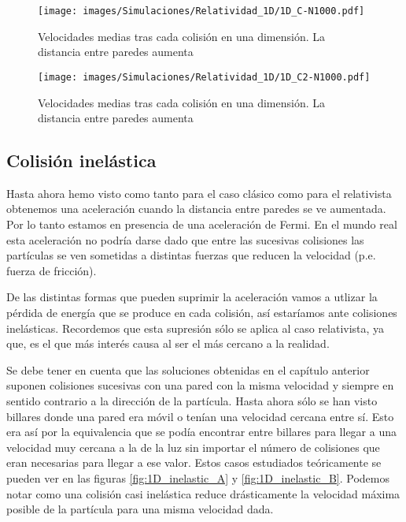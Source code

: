 \documentclass[11pt, spanish]{book}
\begin{document}
\begin{figure}[H]
    \centering
    \texttt{[image: images/Simulaciones/Relatividad\_1D/1D\_C-N1000.pdf]}
    \caption{Velocidades medias tras cada colisión en una dimensión. La distancia entre paredes aumenta}
    \label{fig:relatividad_1D_C}
\end{figure}

\begin{figure}[H]
    \centering
    \texttt{[image: images/Simulaciones/Relatividad\_1D/1D\_C2-N1000.pdf]}
    \caption{Velocidades medias tras cada colisión en una dimensión. La distancia entre paredes aumenta}
    \label{fig:relatividad_1D_C2}
\end{figure}

\subsection{Colisión inelástica}

Hasta ahora hemo visto como tanto para el caso clásico como para el relativista obtenemos una aceleración cuando la distancia entre paredes se ve aumentada. Por lo tanto estamos en presencia de una aceleración de Fermi. En el mundo real esta aceleración no podría darse dado que entre las sucesivas colisiones las partículas se ven sometidas a distintas fuerzas que reducen la velocidad (p.e. fuerza de fricción). 

\vspace{3mm}

De las distintas formas que pueden suprimir la aceleración vamos a utlizar la pérdida de energía que se produce en cada colisión, así estaríamos ante colisiones inelásticas. Recordemos que esta supresión sólo se aplica al caso relativista, ya que, es el que más interés causa al ser el más cercano a la realidad.

\vspace{3mm}

Se debe tener en cuenta que las soluciones obtenidas en el capítulo anterior suponen colisiones sucesivas con una pared con la misma velocidad y siempre en sentido contrario a la dirección de la partícula. Hasta ahora sólo se han visto billares donde una pared era móvil o tenían una velocidad cercana entre sí. Esto era así por la equivalencia que se podía encontrar entre billares para llegar a una velocidad muy cercana a la de la luz sin importar el número de colisiones que eran necesarias para llegar a ese valor. Estos casos estudiados teóricamente se pueden ver en las figuras \ref{fig:1D_inelastic_A} y \ref{fig:1D_inelastic_B}. Podemos notar como una colisión casi inelástica reduce drásticamente la velocidad máxima posible de la partícula para una misma velocidad dada.
\end{document}
